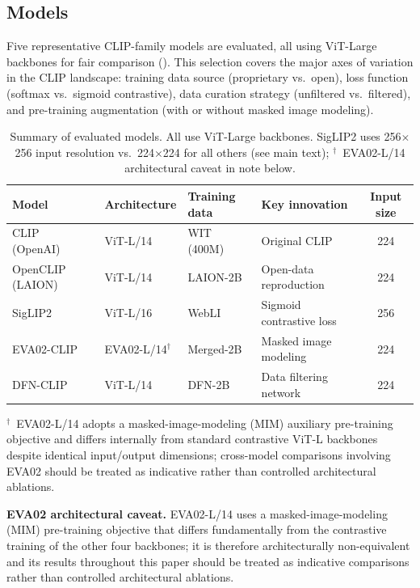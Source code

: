 \documentclass[symmetry,article,submit,pdftex,moreauthors]{Definitions/mdpi}
\begin{document}
\subsection{Models}
\label{sec:models}

Five representative CLIP-family models are evaluated, all using ViT-Large backbones for fair comparison ().
This selection covers the major axes of variation in the CLIP landscape: training data source (proprietary vs.\ open), loss function (softmax vs.\ sigmoid contrastive), data curation strategy (unfiltered vs.\ filtered), and pre-training augmentation (with or without masked image modeling).

\begin{table}[H]
\caption{Summary of evaluated models. All use ViT-Large backbones. SigLIP2 uses 256$\times$256 input resolution vs.\ 224$\times$224 for all others (see main text); $^{\dagger}$~EVA02-L/14 architectural caveat in note below.}
\label{tab:models}
\centering
\small
\setlength{\tabcolsep}{4pt}
\begin{tabular}{llllc}
\toprule
\textbf{Model} & \textbf{Architecture} & \textbf{Training data} & \textbf{Key innovation} & \textbf{Input size} \\
\midrule
CLIP (OpenAI)~\cite{radford2021learning} & ViT-L/14 & WIT (400M) & Original CLIP & 224 \\
OpenCLIP (LAION)~\cite{cherti2023reproducible} & ViT-L/14 & LAION-2B & Open-data reproduction & 224 \\
SigLIP2~\cite{tschannen2025siglip2} & ViT-L/16 & WebLI & Sigmoid contrastive loss & 256 \\
EVA02-CLIP~\cite{sun2023eva02} & EVA02-L/14$^{\dagger}$ & Merged-2B & Masked image modeling & 224 \\
DFN-CLIP~\cite{fang2023data} & ViT-L/14 & DFN-2B & Data filtering network & 224 \\
\bottomrule
\end{tabular}
\vspace{3pt}
{\footnotesize $^{\dagger}$~EVA02-L/14 adopts a masked-image-modeling (MIM) auxiliary pre-training objective and differs internally from standard contrastive ViT-L backbones despite identical input/output dimensions; cross-model comparisons involving EVA02 should be treated as indicative rather than controlled architectural ablations.}
\end{table}

\textbf{EVA02 architectural caveat.} EVA02-L/14 uses a masked-image-modeling (MIM) pre-training objective that differs fundamentally from the contrastive training of the other four backbones; it is therefore architecturally non-equivalent and its results throughout this paper should be treated as indicative comparisons rather than controlled architectural ablations.
\end{document}
